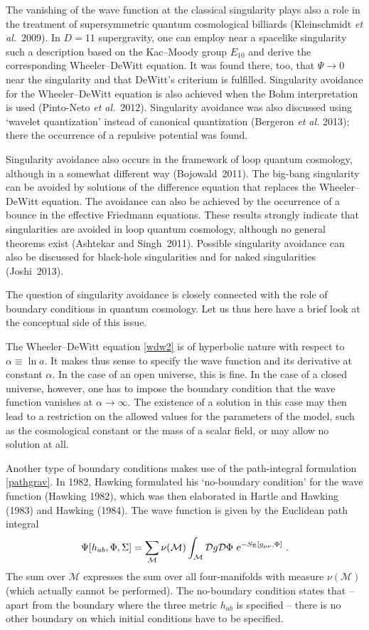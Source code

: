 \documentclass[12pt,a4paper]{article}
\newcommand{\be}{\begin{equation}}
\newcommand{\ee}{\end{equation}}
\newcommand{\lb}{\label}
\newcommand{\E}{{\rm e}}
\begin{document}
The vanishing of the wave function at the classical singularity plays
also a role in the treatment of
supersymmetric quantum cosmological billiards (Kleinschmidt {\em et
  al.}~2009). In $D=11$ supergravity, one can employ near
a spacelike singularity such a description based on the
Kac--Moody group $E_{10}$ and derive the corresponding
Wheeler--DeWitt equation. It was found there, too, that 
$\Psi\to 0$ near the singularity and that DeWitt's criterium is
fulfilled. Singularity avoidance for the Wheeler--DeWitt equation is
also achieved when the Bohm interpretation is used (Pinto-Neto {\em et
  al.}~2012). Singularity avoidance was also discussed using `wavelet
quantization' instead of canonical quantization (Bergeron {\em et al.}
2013); there the occurrence of a repulsive potential was found. 
 
Singularity avoidance also occurs in the framework of
loop quantum cosmology, although in a somewhat different way
(Bojowald~2011). The big-bang singularity can be avoided by solutions
of the difference equation that replaces the Wheeler--DeWitt
equation. The avoidance can also be achieved by the occurrence of a
bounce in the effective Friedmann equations. These results strongly
indicate that singularities are avoided in loop quantum
cosmology, although no general theorems exist (Ashtekar and
Singh~2011). Possible singularity avoidance can also be discussed for
black-hole singularities and for naked singularities (Joshi~2013). 

The question of singularity avoidance is closely connected with the
role of boundary conditions in quantum cosmology. Let us thus here
have a brief look at the conceptual side of this issue.

The Wheeler--DeWitt equation \eqref{wdw2} is of hyperbolic nature with
respect to $\alpha\equiv \ln a$. It makes thus sense to specify the wave
function and its derivative at constant $\alpha$. In the case of an
open universe, this is fine. In the case of a closed universe,
however, one has to impose the boundary condition that the wave
function vanishes at $\alpha\to\infty$. The existence of a
solution in this case may then lead to a restriction on the allowed
values for the parameters of the model, such as the cosmological
constant or the mass of a scalar field, or may allow no solution at all. 

Another type of boundary conditions makes use of the path-integral
formulation \eqref{pathgrav}. In 1982, Hawking formulated his
`no-boundary condition' for the wave function (Hawking 1982), which
was then elaborated in Hartle and Hawking (1983) and Hawking (1984). 
The wave function is given by the Euclidean path integral
\be
\lb{8.3.1}
\Psi[h_{ab},\Phi,\Sigma]=\sum_{\mathcal M}\nu({\mathcal M})
\int_{\mathcal M}{\mathcal D}g{\mathcal D}\Phi\
\E^{-S_{\rm E}[g_{\mu\nu},\Phi]}\ .
\ee
The sum over $ {\mathcal M}$ expresses the sum over all four-manifolds
with measure $\nu({\mathcal M})$ (which actually cannot be
performed). The no-boundary condition states 
that -- apart from the boundary where the three metric $h_{ab}$ is
specified -- there is no other boundary on which initial
conditions have to be specified. 
\end{document}
